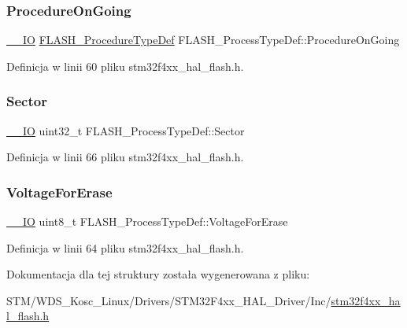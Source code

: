 \subsubsection{\texorpdfstring{Procedure\+On\+Going}{ProcedureOnGoing}}
{\footnotesize\ttfamily \hyperlink{core__sc300_8h_aec43007d9998a0a0e01faede4133d6be}{\+\_\+\+\_\+\+IO} \hyperlink{group___f_l_a_s_h___exported___types_ga2b0268387bc11bcab76be9ce7c43eaaf}{F\+L\+A\+S\+H\+\_\+\+Procedure\+Type\+Def} F\+L\+A\+S\+H\+\_\+\+Process\+Type\+Def\+::\+Procedure\+On\+Going}



Definicja w linii 60 pliku stm32f4xx\+\_\+hal\+\_\+flash.\+h.

\mbox{\label{struct_f_l_a_s_h___process_type_def_a0c9115ac01c2fefd3c6ad112e7133b29}} 
\subsubsection{\texorpdfstring{Sector}{Sector}}
{\footnotesize\ttfamily \hyperlink{core__sc300_8h_aec43007d9998a0a0e01faede4133d6be}{\+\_\+\+\_\+\+IO} uint32\+\_\+t F\+L\+A\+S\+H\+\_\+\+Process\+Type\+Def\+::\+Sector}



Definicja w linii 66 pliku stm32f4xx\+\_\+hal\+\_\+flash.\+h.

\mbox{\label{struct_f_l_a_s_h___process_type_def_aac2fd0eb2907b7317b0f620fb5303c21}} 
\subsubsection{\texorpdfstring{Voltage\+For\+Erase}{VoltageForErase}}
{\footnotesize\ttfamily \hyperlink{core__sc300_8h_aec43007d9998a0a0e01faede4133d6be}{\+\_\+\+\_\+\+IO} uint8\+\_\+t F\+L\+A\+S\+H\+\_\+\+Process\+Type\+Def\+::\+Voltage\+For\+Erase}



Definicja w linii 64 pliku stm32f4xx\+\_\+hal\+\_\+flash.\+h.



Dokumentacja dla tej struktury została wygenerowana z pliku\+:\begin{DoxyCompactItemize}
\item 
S\+T\+M/\+W\+D\+S\+\_\+\+Kosc\+\_\+\+Linux/\+Drivers/\+S\+T\+M32\+F4xx\+\_\+\+H\+A\+L\+\_\+\+Driver/\+Inc/\hyperlink{stm32f4xx__hal__flash_8h}{stm32f4xx\+\_\+hal\+\_\+flash.\+h}\end{DoxyCompactItemize}
